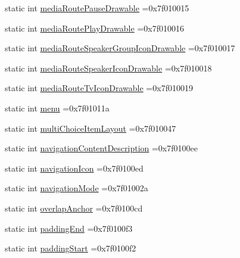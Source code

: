 \begin{DoxyCompactItemize}
\item 
static int \hyperlink{classandroid_1_1support_1_1v7_1_1cardview_1_1R_1_1attr_a37dd4d368db06e40a8237aaeed55bba9}{media\+Route\+Pause\+Drawable} =0x7f010015
\item 
static int \hyperlink{classandroid_1_1support_1_1v7_1_1cardview_1_1R_1_1attr_a512e993917ec21dd61380d55022898ce}{media\+Route\+Play\+Drawable} =0x7f010016
\item 
static int \hyperlink{classandroid_1_1support_1_1v7_1_1cardview_1_1R_1_1attr_a3761f53c1f4730800c58e932feb383fa}{media\+Route\+Speaker\+Group\+Icon\+Drawable} =0x7f010017
\item 
static int \hyperlink{classandroid_1_1support_1_1v7_1_1cardview_1_1R_1_1attr_a00e185878f53f530a81fc5510b692f32}{media\+Route\+Speaker\+Icon\+Drawable} =0x7f010018
\item 
static int \hyperlink{classandroid_1_1support_1_1v7_1_1cardview_1_1R_1_1attr_a538c7ade0ab0f6512c286e58421e54a7}{media\+Route\+Tv\+Icon\+Drawable} =0x7f010019
\item 
static int \hyperlink{classandroid_1_1support_1_1v7_1_1cardview_1_1R_1_1attr_afc99d2d0e0fecb1c2703d65bd4e1ec0c}{menu} =0x7f01011a
\item 
static int \hyperlink{classandroid_1_1support_1_1v7_1_1cardview_1_1R_1_1attr_ae83893129928ab526e6828c21bea9dff}{multi\+Choice\+Item\+Layout} =0x7f010047
\item 
static int \hyperlink{classandroid_1_1support_1_1v7_1_1cardview_1_1R_1_1attr_af2cce7ed6eca186ae590d5969dfdb847}{navigation\+Content\+Description} =0x7f0100ee
\item 
static int \hyperlink{classandroid_1_1support_1_1v7_1_1cardview_1_1R_1_1attr_af6d320e73203dd5ad5b891676fda2728}{navigation\+Icon} =0x7f0100ed
\item 
static int \hyperlink{classandroid_1_1support_1_1v7_1_1cardview_1_1R_1_1attr_a2e22dbe20931048f60b82a6a397e1626}{navigation\+Mode} =0x7f01002a
\item 
static int \hyperlink{classandroid_1_1support_1_1v7_1_1cardview_1_1R_1_1attr_a45f20b43e5ada98f00d472a27f414032}{overlap\+Anchor} =0x7f0100cd
\item 
static int \hyperlink{classandroid_1_1support_1_1v7_1_1cardview_1_1R_1_1attr_a07d1a86cd095b0bb58de34c228cbd699}{padding\+End} =0x7f0100f3
\item 
static int \hyperlink{classandroid_1_1support_1_1v7_1_1cardview_1_1R_1_1attr_ab0808b4220876c60ce26172cd57804f6}{padding\+Start} =0x7f0100f2
\item 

\end{DoxyCompactItemize}
